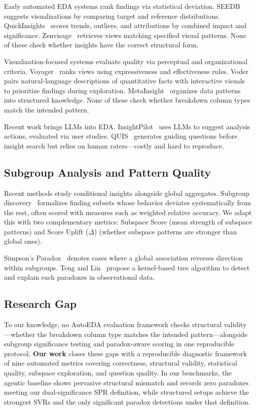 \documentclass[conference]{IEEEtran}
\begin{document}
Early automated EDA systems rank findings via statistical deviation. SEEDB~\cite{seedb} suggests visualizations by comparing target and reference distributions. QuickInsights~\cite{quickinsights} scores trends, outliers, and attributions by combined impact and significance. Zenvisage~\cite{zenvisage} retrieves views matching specified visual patterns. None of these check whether insights have the correct structural form.

Visualization-focused systems evaluate quality via perceptual and organizational criteria. Voyager~\cite{voyager} ranks views using expressiveness and effectiveness rules. Voder~\cite{voder} pairs natural-language descriptions of quantitative facts with interactive visuals to prioritize findings during exploration. MetaInsight~\cite{metainsight} organizes data patterns into structured knowledge. None of these check whether breakdown column types match the intended pattern.

Recent work brings LLMs into EDA. InsightPilot~\cite{insightpilot} uses LLMs to suggest analysis actions, evaluated via user studies. QUIS~\cite{quis} generates guiding questions before insight search but relies on human raters---costly and hard to reproduce.

\subsection{Subgroup Analysis and Pattern Quality}

Recent methods study conditional insights alongside global aggregates. Subgroup discovery~\cite{bach} formalizes finding subsets whose behavior deviates systematically from the rest, often scored with measures such as weighted relative accuracy. We adapt this with two complementary metrics: Subspace Score (mean strength of subspace patterns) and Score Uplift ($\Delta$) (whether subspace patterns are stronger than global ones).

Simpson's Paradox~\cite{simpson} denotes cases where a global association reverses direction within subgroups. Teng and Lin~\cite{teng} propose a kernel-based tree algorithm to detect and explain such paradoxes in observational data.

\subsection{Research Gap}

To our knowledge, no AutoEDA evaluation framework checks structural validity---whether the breakdown column type matches the intended pattern---alongside subgroup significance testing and paradox-aware scoring in one reproducible protocol. \textbf{Our work} closes these gaps with a reproducible diagnostic framework of nine automated metrics covering correctness, structural validity, statistical quality, subspace exploration, and question quality. In our benchmarks, the agentic baseline shows pervasive structural mismatch and records zero paradoxes meeting our dual-significance SPR definition, while structured setups achieve the strongest SVRs and the only significant paradox detections under that definition.
\end{document}
